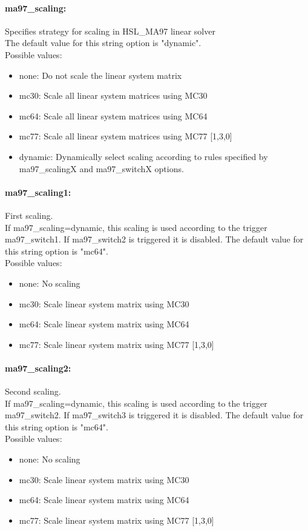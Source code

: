 \paragraph{ma97\_scaling:}\label{opt:ma97_scaling} Specifies strategy for scaling in HSL\_MA97 linear solver \\
 The default value for this string option is "dynamic".
\\ 
Possible values:
\begin{itemize}
   \item none: Do not scale the linear system matrix
   \item mc30: Scale all linear system matrices using MC30
   \item mc64: Scale all linear system matrices using MC64
   \item mc77: Scale all linear system matrices using MC77
[1,3,0]
   \item dynamic: Dynamically select scaling according to rules
specified by ma97\_scalingX and ma97\_switchX
options.
\end{itemize}

\paragraph{ma97\_scaling1:}\label{opt:ma97_scaling1} First scaling. \\
 If ma97\_scaling=dynamic, this scaling is used
according to the trigger ma97\_switch1. If
ma97\_switch2 is triggered it is disabled. The default value for this string option is "mc64".
\\ 
Possible values:
\begin{itemize}
   \item none: No scaling
   \item mc30: Scale linear system matrix using MC30
   \item mc64: Scale linear system matrix using MC64
   \item mc77: Scale linear system matrix using MC77 [1,3,0]
\end{itemize}

\paragraph{ma97\_scaling2:}\label{opt:ma97_scaling2} Second scaling. \\
 If ma97\_scaling=dynamic, this scaling is used
according to the trigger ma97\_switch2. If
ma97\_switch3 is triggered it is disabled. The default value for this string option is "mc64".
\\ 
Possible values:
\begin{itemize}
   \item none: No scaling
   \item mc30: Scale linear system matrix using MC30
   \item mc64: Scale linear system matrix using MC64
   \item mc77: Scale linear system matrix using MC77 [1,3,0]
\end{itemize}

